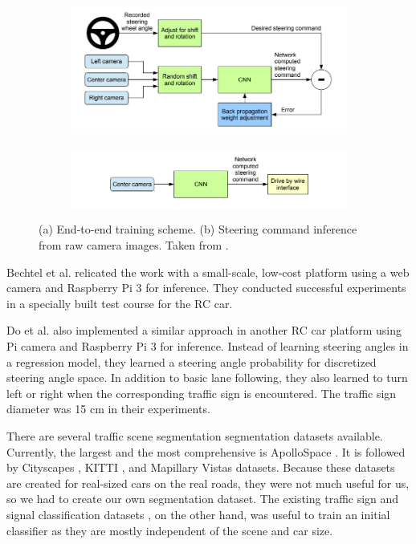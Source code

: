 \begin{figure}[h]
  \centering
  \begin{subfigure}[b]{0.4\linewidth}
      \includegraphics[width=\linewidth]{figures/end-to-end-training.png}
    \caption{}
  \end{subfigure}
  \begin{subfigure}[b]{0.4\linewidth}
      \includegraphics[width=\linewidth]{figures/end-to-end-inference.png}
    \caption{}
  \end{subfigure}
  \caption{(a) End-to-end training scheme. (b) Steering command inference from
  raw camera images. Taken from \cite{Bojarski2016EndTE}.}
  \label{figure:end-to-end-network}
\end{figure}

Bechtel et al. \cite{Bechtel2017DeepPicarAL} relicated the work
\cite{Bojarski2016EndTE} with a small-scale, low-cost platform using a web
camera and Raspberry Pi 3 for inference. They conducted successful experiments
in a specially built test course for the RC car.

Do et al. \cite{Do2018RealTimeSC} also implemented a similar approach in
another RC car platform using Pi camera and Raspberry Pi 3 for inference.
Instead of learning steering angles in a regression model, they learned a
steering angle probability for discretized steering angle space. In addition to
basic lane following, they also learned to turn left or right when the
corresponding traffic sign is encountered. The traffic sign diameter was 15 cm
in their experiments.

There are several traffic scene segmentation segmentation datasets available.
Currently, the largest and the most comprehensive is ApolloSpace
\cite{Huang2018TheAD}. It is followed by Cityscapes \cite{Cordts2016TheCD},
KITTI \cite{Geiger2012AreWR}, and Mapillary Vistas \cite{Neuhold2017TheMV}
datasets. Because these datasets are created for real-sized cars on the real
roads, they were not much useful for us, so we had to create our own
segmentation dataset. The existing traffic sign and signal classification
datasets \cite{cite11, cite12, Shakhuro2016RussianTS,
Serna2018ClassificationOT, MaldonadoBascn2007RoadSignDA}, on the other hand,
was useful to train an initial classifier as they are mostly independent of the
scene and car size.

